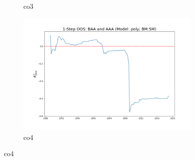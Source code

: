 \documentclass[a4paper,12pt,times,numbered,print,index]{report}
\numberwithin{equation}{section}
\begin{document}
\begin{figure}[!htbp]
\begin{subfigure}[b]{0.42\linewidth}
		\caption{co3}
	\end{subfigure}
	\begin{subfigure}[b]{0.42\linewidth}
		\includegraphics[width=0.9\linewidth]{OOS_plots/poly_co4_SM.png}
		\caption{co4}
	\end{subfigure}
	\label{g7}
\end{figure}
\end{document}
